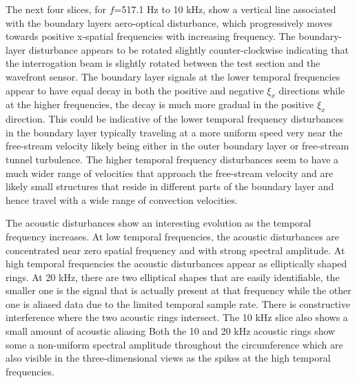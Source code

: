 The next four slices, for $f$=517.1 Hz to 10 kHz, show a vertical line associated with the boundary layers aero-optical disturbance, which  progressively moves towards positive x-spatial frequencies with increasing frequency.
The boundary-layer disturbance appears to be rotated slightly counter-clockwise indicating that the interrogation beam is slightly rotated between the test section and the wavefront sensor.
The boundary layer signals at the lower temporal frequencies appear to have equal decay in both the positive and negative $\xi_x$ directions while at the higher frequencies, the decay is much more gradual in the positive $\xi_x$ direction.
This could be indicative of the lower temporal frequency disturbances in the boundary layer typically traveling at a more uniform speed very near the free-stream velocity likely being either in the outer boundary layer or free-stream tunnel turbulence.
The higher temporal frequency disturbances seem to have a much wider range of velocities that approach the free-stream velocity and are likely small structures that reside in different parts of the boundary layer and hence travel with a wide range of convection velocities.

The acoustic disturbances show an interesting evolution as the temporal frequency increases.
At low temporal frequencies, the acoustic disturbances are concentrated near zero spatial frequency and with strong spectral amplitude.
At high temporal frequencies the acoustic disturbances appear as elliptically shaped rings.
At 20 kHz, there are two elliptical shapes that are easily identifiable, the smaller one is the signal that is actually present at that frequency while the other one is aliased data due to the limited temporal sample rate.
There is constructive interference where the two acoustic rings intersect.
The 10 kHz slice also shows a small amount of acoustic aliasing
Both the 10 and 20 kHz acoustic rings show some a non-uniform spectral amplitude throughout the circumference which are also visible in the three-dimensional views as the spikes at the high temporal frequencies.

